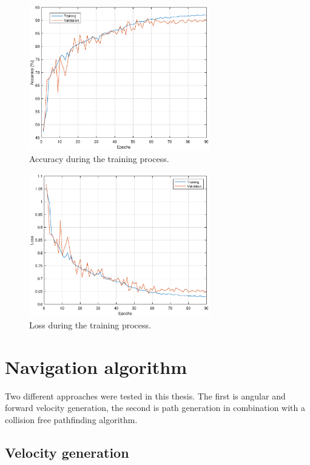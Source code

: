 \begin{figure}[!h]
  \centering
  \includegraphics[width=0.7\textwidth]{./fig/photos/accuracy1.eps}
  \caption{Accuracy during the training process.}
  \label{fig:accuracy}
\end{figure}

\begin{figure}[!h]

  \centering
  \includegraphics[width=0.7\textwidth]{./fig/photos/loss.eps}
  \caption{Loss during the training process.}
  \label{fig:loss}
\end{figure}


\section{Navigation algorithm}

Two different approaches were tested in this thesis. The first is angular and forward velocity generation, the second is path generation in combination with a collision free pathfinding algorithm. 

\subsection{Velocity generation}

